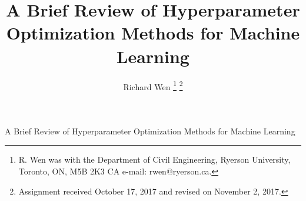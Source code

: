 

\title{A Brief Review of Hyperparameter Optimization Methods for Machine Learning}




\author{Richard Wen%
\thanks{R. Wen was with the Department of Civil Engineering, Ryerson University, Toronto, ON, M5B 2K3 CA e-mail: rwen@ryerson.ca.}%
\thanks{Assignment received October 17, 2017 and revised on November 2, 2017.}}




%
{A Brief Review of Hyperparameter Optimization Methods for Machine Learning}






\maketitle

